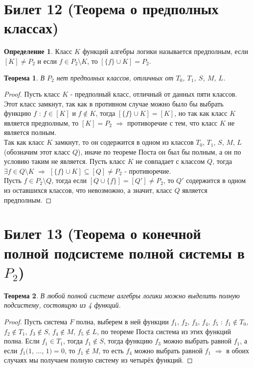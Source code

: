 \documentclass[a4paper, 12pt]{article}
\theoremstyle{definition}
\newtheorem*{definition}{Определение}
\theoremstyle{plain}
\newtheorem*{theorem}{Теорема}
\theoremstyle{remark}
\begin{document}
  \section{Билет 12 (Теорема о предполных классах)}
  \begin{definition}
    Класс $K$ функций алгебры логики называется предполным, если $[K]\neq P_2$ и если $f\in P_2\setminus K$, то $[\{f\}\cup K]=P_2$.
  \end{definition}
  \begin{theorem}
    В $P_2$ нет предполных классов, отличных от $T_0$, $T_1$, $S$, $M$, $L$.
  \end{theorem}
  \begin{proof}
    Пусть класс $K$ - предполный класс, отличный от данных пяти классов. Этот класс замкнут, так как в противном случае можно было бы выбрать функцию $f$ : $f\in[K]$ и $f\notin K$, тогда $[\{f\}\cup K]=[K]$, но так как класс $K$ является предполным, то $[K]=P_2$ $\Longrightarrow$ противоречие с тем, что класс $K$ не является полным.\\
    Так как класс $K$ замкнут, то он содержится в одном из классов $T_0$, $T_1$, $S$, $M$, $L$ (обозначим этот класс $Q$), иначе по теореме Поста он был бы полным, а он по условию таким не является. Пусть класс $K$ не совпадает с классом $Q$, тогда $\exists f\in Q\setminus K$ $\Longrightarrow$ $[\{f\}\cup K]\subseteq[Q]\neq P_2$ - противоречие.\\
    Пусть $f\in P_2\setminus Q$, тогда если $[Q\cup\{f\}]=[Q']\neq P_2$, то $Q'$ содержится в одном из оставшихся классов, что невозможно, а значит, класс $Q$ является предполным.
  \end{proof}
  \section{Билет 13 (Теорема о конечной полной подсистеме полной системы в $P_2$)}
  \begin{theorem}
    В любой полной системе алгебры логики можно выделить полную подсистему, состоящую из 4 функций.
  \end{theorem}
  \begin{proof}
    Пусть система $F$ полна, выберем в ней функции $f_1$, $f_2$, $f_3$, $f_4$, $f_5$ : $f_1\notin T_0$, $f_2\notin T_1$, $f_3\notin S$, $f_4\notin M$, $f_5\notin L$, по теореме Поста система из этих функций полна. Если $f_1\in T_1$, тогда $f_1\notin S$, тогда функцию $f_3$ можно выбрать равной $f_1$, а если $f_1(1$, $\ldots$, $1)=0$, то $f_1\notin M$, то есть $f_4$ можно выбрать равной $f_1$ $\Longrightarrow$ в обоих случаях мы получаем полную систему из четырёх функций.
  \end{proof}
\end{document}
